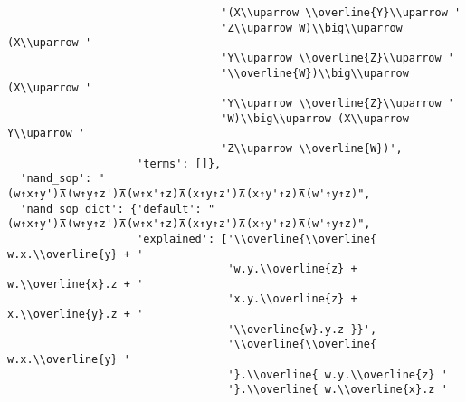 \begin{verbatim}
                                 '(X\\uparrow \\overline{Y}\\uparrow '
                                 'Z\\uparrow W)\\big\\uparrow (X\\uparrow '
                                 'Y\\uparrow \\overline{Z}\\uparrow '
                                 '\\overline{W})\\big\\uparrow (X\\uparrow '
                                 'Y\\uparrow \\overline{Z}\\uparrow '
                                 'W)\\big\\uparrow (X\\uparrow Y\\uparrow '
                                 'Z\\uparrow \\overline{W})',
                    'terms': []},
  'nand_sop': "(w↑x↑y')⊼(w↑y↑z')⊼(w↑x'↑z)⊼(x↑y↑z')⊼(x↑y'↑z)⊼(w'↑y↑z)",
  'nand_sop_dict': {'default': "(w↑x↑y')⊼(w↑y↑z')⊼(w↑x'↑z)⊼(x↑y↑z')⊼(x↑y'↑z)⊼(w'↑y↑z)",
                    'explained': ['\\overline{\\overline{ w.x.\\overline{y} + '
                                  'w.y.\\overline{z} + w.\\overline{x}.z + '
                                  'x.y.\\overline{z} + x.\\overline{y}.z + '
                                  '\\overline{w}.y.z }}',
                                  '\\overline{\\overline{ w.x.\\overline{y} '
                                  '}.\\overline{ w.y.\\overline{z} '
                                  '}.\\overline{ w.\\overline{x}.z '

\end{verbatim}

